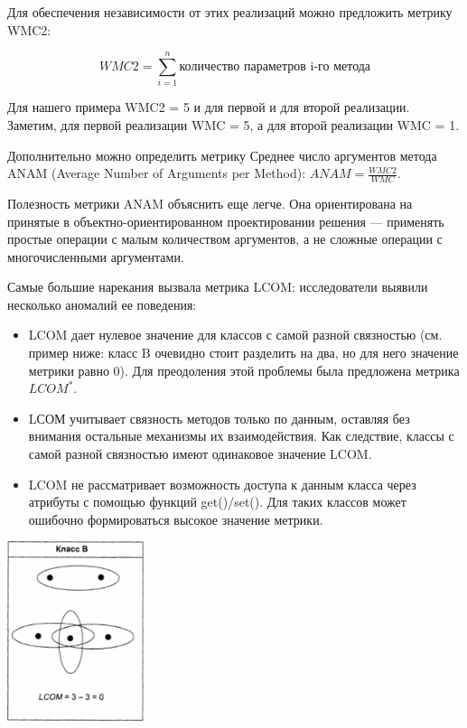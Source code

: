 \documentclass{../../text-style}
\begin{document}
Для обеспечения независимости от этих реализаций можно предложить метрику WMC2:

$$WMC2 = \sum_{i=1}^{n}\text{количество параметров i-го метода}$$

Для нашего примера WMC2 = 5 и для первой и для второй реализации. Заметим, для первой реализации WMC = 5, а для второй реализации WMC = 1.

Дополнительно можно определить метрику Среднее число аргументов метода ANAM (Average Number of Arguments per Method): $ANAM = \frac{WMC2}{WMC}$.

Полезность метрики ANAM объяснить еще легче. Она ориентирована на принятые в объектно-ориентированном проектировании решения --- применять простые операции с малым количеством аргументов, а не сложные операции с многочисленными аргументами.

Самые большие нарекания вызвала метрика LCOM: исследователи выявили несколько аномалий ее поведения:

\begin{itemize}
    \item LCOM дает нулевое значение для классов с самой разной связностью (см. пример ниже: класс B очевидно стоит разделить на два, но для него значение метрики равно 0). Для преодоления этой проблемы была предложена метрика $LCOM^*$.
    \item LСОМ учитывает связность методов только по данным, оставляя без внимания остальные механизмы их взаимодействия. Как следствие, классы с самой разной связностью имеют одинаковое значение LCOM.
    \item LCOM не рассматривает возможность доступа к данным класса через атрибуты с помощью функций get()/set(). Для таких классов может ошибочно формиро­ваться высокое значение метрики.
\end{itemize}

\begin{center}
    \includegraphics[width=0.3\textwidth]{lcomFail.png}
\end{center}
\end{document}
